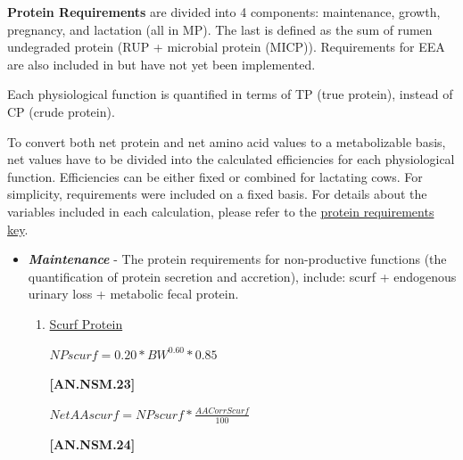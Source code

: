\documentclass{article}
\begin{document}
\begin{refsection}
\begin{itemize}
\vspace{0.5cm}


\end{itemize}

    \textbf{ Protein Requirements} are divided into 4 components: maintenance, growth, pregnancy, and lactation (all in MP). The last is defined as the sum of rumen undegraded protein (RUP + microbial protein (MICP)). Requirements for EEA are also included in \textcite{nrc2021} but have not yet been implemented.
    \vspace{0.2cm}
    
    Each physiological function is quantified in terms of TP (true protein), instead of CP (crude protein).
    \vspace{0.2cm}
    
    To convert both net protein and net amino acid values to a metabolizable basis, net values have to be divided into the calculated efficiencies for each physiological function. Efficiencies can be either fixed or combined for lactating cows. For simplicity, requirements were included on a fixed basis. For details about the variables included in each calculation, please refer to the \hyperref[nasemproteinkey]{protein requirements key}.
    \vspace{0.5cm}

\begin{itemize}
    \item \textbf{\textit{Maintenance}} - The protein requirements for non-productive functions (the quantification of protein secretion and accretion), include: scurf + endogenous urinary loss + metabolic fecal protein.
    \begin{enumerate}
        \item \underline {Scurf Protein}
        \vspace{0.2cm}

\begin{center}
    \(NPscurf = 0.20 * BW^{0.60} * 0.85\)
\end{center}

\vspace{0.5cm}
            {\raggedleft \textbf{[AN.NSM.23]}\par}
        \vspace{0.2cm}

\begin{center}
    \(NetAAscurf = NPscurf * \frac{AACorrScurf}{100}\)
\end{center}

\vspace{0.5cm}
            {\raggedleft \textbf{[AN.NSM.24]}\par}
            \vspace{0.5cm}
            

\end{enumerate}
\end{itemize}
\end{refsection}
\end{document}
